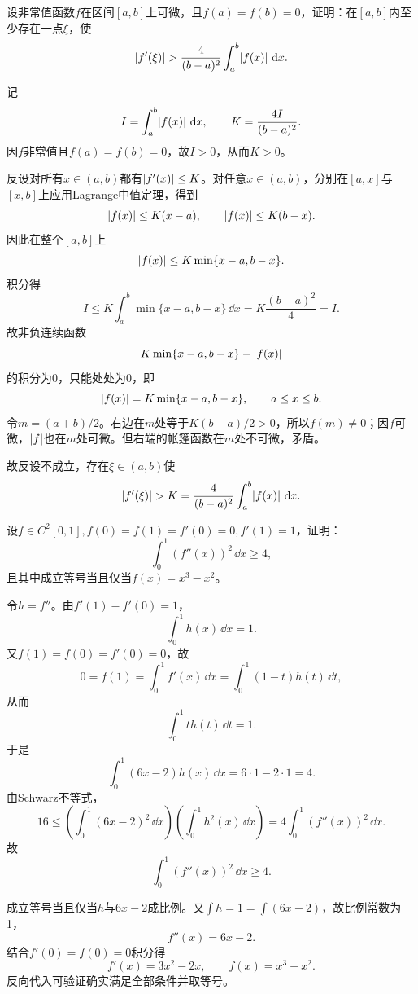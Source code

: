\begin{xreferenceproblem}[12]
设非常值函数$f$在区间$[a,b]$上可微，且$f(a)=f(b)=0$，证明：在$[a,b]$内至少存在一点$\xi$，使
  \[
    \lvert f'(\xi)\rvert>\frac4{(b-a)^2}\int_a^b\lvert f(x)\rvert\,\mathop{}\!\mathrm{d} x.
  \]
\end{xreferenceproblem}
\begin{xsolution}
记
\[
 I=\int_a^b\lvert f(x)\rvert\,\mathop{}\!\mathrm{d} x,
 \qquad K=\frac{4I}{(b-a)^2}.
\]
因$f$非常值且$f(a)=f(b)=0$，故$I>0$，从而$K>0$。

反设对所有$x\in(a,b)$都有$\lvert f'(x)\rvert\le K$。对任意$x\in(a,b)$，分别在$[a,x]$与$[x,b]$上应用Lagrange中值定理，得到
\[
 \lvert f(x)\rvert\le K(x-a),
 \qquad
 \lvert f(x)\rvert\le K(b-x).
\]
因此在整个$[a,b]$上
\[
 \lvert f(x)\rvert\le K\min\{x-a,b-x\}.
\]
积分得
\[
 I\le K\int_a^b\min\{x-a,b-x\}\,\dd x
 =K\frac{(b-a)^2}{4}=I.
\]
故非负连续函数
\[
 K\min\{x-a,b-x\}-\lvert f(x)\rvert
\]
的积分为0，只能处处为0，即
\[
 \lvert f(x)\rvert=K\min\{x-a,b-x\},\qquad a\le x\le b.
\]
令$m=(a+b)/2$。右边在$m$处等于$K(b-a)/2>0$，所以$f(m)\ne0$；因$f$可微，$\lvert f\rvert$也在$m$处可微。但右端的帐篷函数在$m$处不可微，矛盾。

故反设不成立，存在$\xi\in(a,b)$使
\[
 \lvert f'(\xi)\rvert>K
 =\frac4{(b-a)^2}\int_a^b\lvert f(x)\rvert\,\mathop{}\!\mathrm{d} x.
\]
\end{xsolution}


\begin{xreferenceproblem}[13]
设$f\in C^2[0,1],f(0)=f(1)=f'(0)=0,f'(1)=1$，证明：
  \[
    \int_0^1(f''(x))^2\,\dd x\ge4,
  \]
  且其中成立等号当且仅当$f(x)=x^3-x^2$。
\end{xreferenceproblem}
\begin{xsolution}
令$h=f''$。由$f'(1)-f'(0)=1$，
\[
 \int_0^1h(x)\,\dd x=1.
\]
又$f(1)=f(0)=f'(0)=0$，故
\[
 0=f(1)=\int_0^1f'(x)\,\dd x
 =\int_0^1(1-t)h(t)\,\dd t,
\]
从而
\[
 \int_0^1t h(t)\,\dd t=1.
\]
于是
\[
 \int_0^1(6x-2)h(x)\,\dd x
 =6\cdot1-2\cdot1=4.
\]
由Schwarz不等式，
\[
 16\le\left(\int_0^1(6x-2)^2\,\dd x\right)
 \left(\int_0^1h^2(x)\,\dd x\right)
 =4\int_0^1(f''(x))^2\,\dd x.
\]
故
\[
 \int_0^1(f''(x))^2\,\dd x\ge4.
\]

成立等号当且仅当$h$与$6x-2$成比例。又$\int h=1=\int(6x-2)$，故比例常数为1，
\[
 f''(x)=6x-2.
\]
结合$f'(0)=f(0)=0$积分得
\[
 f'(x)=3x^2-2x,
 \qquad f(x)=x^3-x^2.
\]
反向代入可验证确实满足全部条件并取等号。
\end{xsolution}


